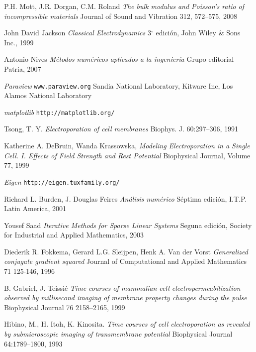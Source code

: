 \begin{thebibliography}{99}
	P.H. Mott, J.R. Dorgan, C.M. Roland 
	\emph{The bulk modulus and Poisson's ratio of incompressible materials} 
	Journal of Sound and Vibration 312, 572–575, 2008
	
	John David Jackson
	\emph{Classical Electrodynamics}
	3$^{\circ}$ edición,
	John Wiley \& Sons Inc.,
	1999

	Antonio Nives
	\emph{Métodos numéricos aplicados a la ingeniería}
	Grupo editorial Patria,
	2007

	\emph{Paraview}
	\texttt{www.paraview.org}
	Sandia National Laboratory, Kitware Inc, Los Alamos National Laboratory

	\emph{matplotlib}
	\texttt{http://matplotlib.org/}

	Tsong, T. Y.
	\emph{Electroporation of cell membranes}
	Biophys. J. 60:297–306, 1991

	Katherine A. DeBruin, Wanda Krassowska, 
	\emph{Modeling Electroporation in a Single Cell. I. Effects of Field Strength and
Rest Potential}
	Biophysical Journal, Volume 77, 1999
	
	\emph{Eigen}
	\texttt{http://eigen.tuxfamily.org/}
	
	Richard L. Burden, J. Douglas Feires
	\emph{Análisis numérico}
	Séptima edición, I.T.P. Latin America, 2001

	Yousef Saad
	\emph{Iterative Methods for Sparse Linear Systems}
	Seguna edición, Society for Industrial and Applied Mathematics, 2003

    Diederik R. Fokkema, Gerard L.G. Sleijpen, Henk A. Van der Vorst
    \emph{Generalized conjugate gradient squared}
    Journal of Computational and Applied Mathematics 71 125-146, 1996

    B. Gabriel, J. Teissié
    \emph{Time courses of mammalian cell electropermeabilization observed by millisecond imaging of membrane property changes during the pulse}
    Biophysical Journal 76 2158–2165, 1999

    Hibino, M., H. Itoh, K. Kinosita.
    \emph{Time courses of cell electroporation as revealed by submicroscopic imaging of transmembrane potential}
    Biophysical Journal 64:1789–1800, 1993

\end{thebibliography}
